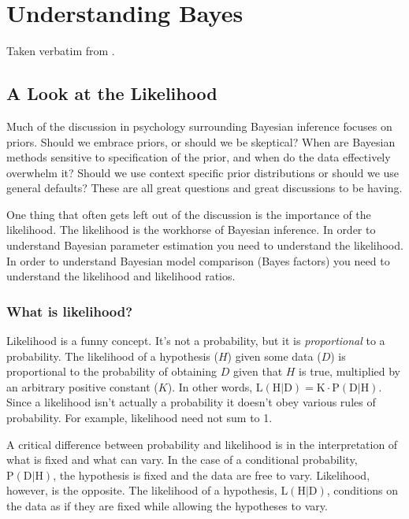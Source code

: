 
\chapter{Understanding Bayes}
\label{chap:UnderstandingBayes}


Taken verbatim from \cite{etz2015a,etz2015d,etz2015b,etz2015c,etz2016a}.

\section{A Look at the Likelihood}
\label{sec:ALookattheLikelihood}

Much of the discussion in psychology surrounding Bayesian inference focuses on priors. Should we embrace priors, or should we be skeptical? When are Bayesian methods sensitive to specification of the prior, and when do the data effectively overwhelm it? Should we use context specific prior distributions or should we use general defaults? These are all great questions and great discussions to be having.

One thing that often gets left out of the discussion is the importance of the likelihood. The likelihood is the workhorse of Bayesian inference. In order to understand Bayesian parameter estimation you need to understand the likelihood. In order to understand Bayesian model comparison (Bayes factors) you need to understand the likelihood and likelihood ratios.

\subsection{What is likelihood?}

Likelihood is a funny concept. It's not a probability, but it is \textit{proportional} to a probability. The likelihood of a hypothesis ($H$) given some data ($D$) is proportional to the probability of obtaining $D$ given that $H$ is true, multiplied by an arbitrary positive constant ($K$). In other words, $\mathrm{L}(\mathrm{H} | \mathrm{D})=\mathrm{K} \cdot \mathrm{P}(\mathrm{D} | \mathrm{H})$. Since a likelihood isn't actually a probability it doesn't obey various rules of probability. For example, likelihood need not sum to 1.

A critical difference between probability and likelihood is in the interpretation of what is fixed and what can vary. In the case of a conditional probability, $\mathrm{P}(\mathrm{D} | \mathrm{H})$, the hypothesis is fixed and the data are free to vary. Likelihood, however, is the opposite. The likelihood of a hypothesis, $\mathrm{L}(\mathrm{H} | \mathrm{D})$, conditions on the data as if they are fixed while allowing the hypotheses to vary.

